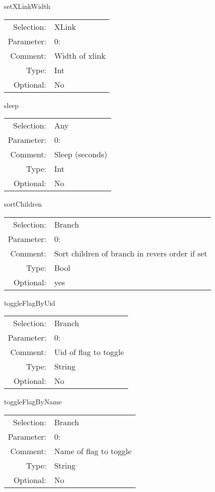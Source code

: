 \item setXLinkWidth\\
\begin{tabular}{rl}
  Selection: & XLink\\
   Parameter: &  0:\\
        Comment: & Width of xlink\\
           Type: & Int\\
       Optional: &  No\\
\end{tabular}

\item sleep\\
\begin{tabular}{rl}
  Selection: & Any\\
   Parameter: &  0:\\
        Comment: & Sleep (seconds)\\
           Type: & Int\\
       Optional: &  No\\
\end{tabular}

\item sortChildren\\
\begin{tabular}{rl}
  Selection: & Branch\\
   Parameter: &  0:\\
        Comment: & Sort children of branch in revers order if set\\
           Type: & Bool\\
       Optional: &  yes\\
\end{tabular}

\item toggleFlagByUid\\
\begin{tabular}{rl}
  Selection: & Branch\\
   Parameter: &  0:\\
        Comment: & Uid of flag to toggle\\
           Type: & String\\
       Optional: &  No\\
\end{tabular}

\item toggleFlagByName\\
\begin{tabular}{rl}
  Selection: & Branch\\
   Parameter: &  0:\\
        Comment: & Name of flag to toggle\\
           Type: & String\\
       Optional: &  No\\
\end{tabular}

